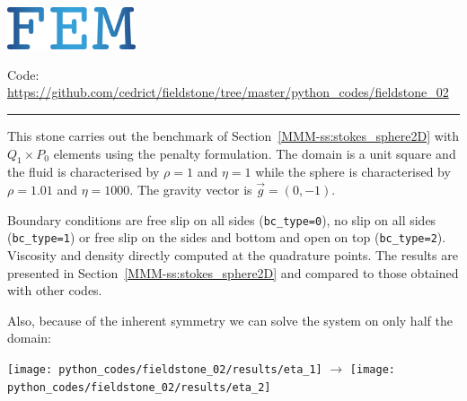 \includegraphics[height=1.25cm]{images/pictograms/FEM}




\begin{center}
\inpython
{\small Code: \url{https://github.com/cedrict/fieldstone/tree/master/python_codes/fieldstone_02}}
\end{center}

\par\noindent\rule{\textwidth}{0.4pt}

This stone carries out the benchmark of Section~\ref{MMM-ss:stokes_sphere2D}
with $Q_1\times P_0$ elements using the penalty formulation.
The domain is a unit square and the fluid is characterised 
by $\rho=1$ and $\eta=1$ 
while the sphere is characterised 
by $\rho=1.01$ and $\eta=1000$.
The gravity vector is $\vec{g}=(0,-1)$. 

Boundary conditions are free slip on all sides ({\tt bc\_type=0}), 
no slip on all sides ({\tt bc\_type=1}) or free slip on the sides and bottom and open 
on top ({\tt bc\_type=2}).
Viscosity and density directly computed at the quadrature points.
The results are presented in Section~\ref{MMM-ss:stokes_sphere2D} and compared to 
those obtained with other codes.

Also, because of the inherent symmetry we can solve the system 
on only half the domain:
\begin{center}
\texttt{[image: python\_codes/fieldstone\_02/results/eta\_1]}
$\rightarrow$
\texttt{[image: python\_codes/fieldstone\_02/results/eta\_2]}
\end{center}

